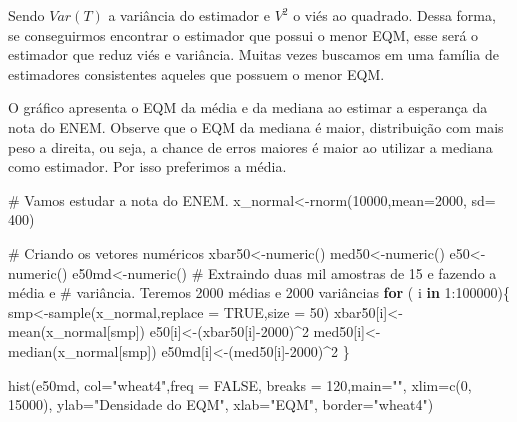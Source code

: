 \documentclass[
  letterpaper,
  DIV=11,
  numbers=noendperiod]{scrartcl}
\newenvironment{Shaded}{\begin{snugshade}}{\end{snugshade}}
\newcommand{\AttributeTok}[1]{\textcolor[rgb]{0.40,0.45,0.13}{#1}}
\newcommand{\CommentTok}[1]{\textcolor[rgb]{0.37,0.37,0.37}{#1}}
\newcommand{\ConstantTok}[1]{\textcolor[rgb]{0.56,0.35,0.01}{#1}}
\newcommand{\ControlFlowTok}[1]{\textcolor[rgb]{0.00,0.23,0.31}{\textbf{#1}}}
\newcommand{\DecValTok}[1]{\textcolor[rgb]{0.68,0.00,0.00}{#1}}
\newcommand{\FunctionTok}[1]{\textcolor[rgb]{0.28,0.35,0.67}{#1}}
\newcommand{\NormalTok}[1]{\textcolor[rgb]{0.00,0.23,0.31}{#1}}
\newcommand{\OtherTok}[1]{\textcolor[rgb]{0.00,0.23,0.31}{#1}}
\newcommand{\SpecialCharTok}[1]{\textcolor[rgb]{0.37,0.37,0.37}{#1}}
\newcommand{\StringTok}[1]{\textcolor[rgb]{0.13,0.47,0.30}{#1}}
\begin{document}
Sendo \(Var (T)\) a variância do estimador e \(V^{2}\) o viés ao
quadrado. Dessa forma, se conseguirmos encontrar o estimador que possui
o menor EQM, esse será o estimador que reduz viés e variância. Muitas
vezes buscamos em uma família de estimadores consistentes aqueles que
possuem o menor EQM.

O gráfico apresenta o EQM da média e da mediana ao estimar a esperança
da nota do ENEM. Observe que o EQM da mediana é maior, distribuição com
mais peso a direita, ou seja, a chance de erros maiores é maior ao
utilizar a mediana como estimador. Por isso preferimos a média.

\begin{Shaded}
\begin{Highlighting}[]
\CommentTok{\# Vamos estudar a nota do ENEM. }
\NormalTok{x\_normal}\OtherTok{\textless{}{-}}\FunctionTok{rnorm}\NormalTok{(}\DecValTok{10000}\NormalTok{,}\AttributeTok{mean=}\DecValTok{2000}\NormalTok{, }\AttributeTok{sd=} \DecValTok{400}\NormalTok{)}

\CommentTok{\# Criando os vetores numéricos }
\NormalTok{xbar50}\OtherTok{\textless{}{-}}\FunctionTok{numeric}\NormalTok{()}
\NormalTok{med50}\OtherTok{\textless{}{-}}\FunctionTok{numeric}\NormalTok{()}
\NormalTok{e50}\OtherTok{\textless{}{-}}\FunctionTok{numeric}\NormalTok{()}
\NormalTok{e50md}\OtherTok{\textless{}{-}}\FunctionTok{numeric}\NormalTok{()}
\CommentTok{\# Extraindo duas mil amostras de 15 e fazendo a média e }
\CommentTok{\# variância. Teremos 2000 médias e 2000 variâncias }
\ControlFlowTok{for}\NormalTok{ ( i }\ControlFlowTok{in} \DecValTok{1}\SpecialCharTok{:}\DecValTok{100000}\NormalTok{)\{}
\NormalTok{  smp}\OtherTok{\textless{}{-}}\FunctionTok{sample}\NormalTok{(x\_normal,}\AttributeTok{replace =} \ConstantTok{TRUE}\NormalTok{,}\AttributeTok{size =} \DecValTok{50}\NormalTok{)}
\NormalTok{  xbar50[i]}\OtherTok{\textless{}{-}}\FunctionTok{mean}\NormalTok{(x\_normal[smp])}
\NormalTok{  e50[i]}\OtherTok{\textless{}{-}}\NormalTok{(xbar50[i]}\SpecialCharTok{{-}}\DecValTok{2000}\NormalTok{)}\SpecialCharTok{\^{}}\DecValTok{2}
\NormalTok{  med50[i]}\OtherTok{\textless{}{-}}\FunctionTok{median}\NormalTok{(x\_normal[smp])}
\NormalTok{  e50md[i]}\OtherTok{\textless{}{-}}\NormalTok{(med50[i]}\SpecialCharTok{{-}}\DecValTok{2000}\NormalTok{)}\SpecialCharTok{\^{}}\DecValTok{2}
\NormalTok{\}}

\FunctionTok{hist}\NormalTok{(e50md, }\AttributeTok{col=}\StringTok{"wheat4"}\NormalTok{,}\AttributeTok{freq =} \ConstantTok{FALSE}\NormalTok{, }\AttributeTok{breaks =} \DecValTok{120}\NormalTok{,}\AttributeTok{main=}\StringTok{""}\NormalTok{,}
     \AttributeTok{xlim=}\FunctionTok{c}\NormalTok{(}\DecValTok{0}\NormalTok{, }\DecValTok{15000}\NormalTok{), }\AttributeTok{ylab=}\StringTok{"Densidade do EQM"}\NormalTok{, }\AttributeTok{xlab=}\StringTok{"EQM"}\NormalTok{,}
     \AttributeTok{border=}\StringTok{"wheat4"}\NormalTok{)}


\end{Highlighting}
\end{Shaded}
\end{document}
